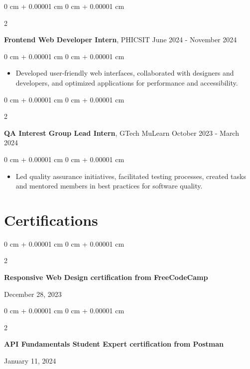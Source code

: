 \documentclass[10pt, letterpaper]{article}
\newenvironment{highlights}{
    \begin{itemize}[
        topsep=0.10 cm,
        parsep=0.10 cm,
        partopsep=0pt,
        itemsep=0pt,
        leftmargin=0 cm + 10pt
    ]
}{
    \end{itemize}
} %
\newenvironment{onecolentry}{
    \begin{adjustwidth}{
        0 cm + 0.00001 cm
    }{
        0 cm + 0.00001 cm
    }
}{
    \end{adjustwidth}
} %
\newenvironment{twocolentry}[2][]{
    \onecolentry
    \def\secondColumn{#2}
    \setcolumnwidth{\fill, 4.5 cm}
    \begin{paracol}{2}
}{
    \switchcolumn \raggedleft \secondColumn
    \end{paracol}
    \endonecolentry
} %
\begin{document}
        \vspace{0.2 cm}
        
        \begin{twocolentry}{
            June 2024 - November 2024
        }
            \textbf{Frontend Web Developer Intern}, PHICSIT\end{twocolentry}

        \vspace{0.10 cm}
        \begin{onecolentry}
            \begin{highlights}
                \item Developed user-friendly web interfaces, collaborated with designers and developers, and optimized applications for performance and accessibility.
            \end{highlights}
        \end{onecolentry}

        \vspace{0.2 cm}

        \begin{twocolentry}{
            October 2023 - March 2024
        }
            \textbf{QA Interest Group Lead Intern}, GTech MuLearn\end{twocolentry}

        \vspace{0.10 cm}
        \begin{onecolentry}
            \begin{highlights}
                \item Led quality assurance initiatives, facilitated testing processes, created tasks and mentored members in best practices for software quality.
            \end{highlights}
        \end{onecolentry}


\section{Certifications}
        \begin{samepage}
            \begin{twocolentry}{
                December 28, 2023
            }
           \textbf{Responsive Web Design certification from FreeCodeCamp} 
            \end{twocolentry}
        \begin{twocolentry}{
                January 11, 2024
            }
           \textbf{API Fundamentals Student Expert certification from Postman} 
            \end{twocolentry}
        \end{samepage}
\end{document}
